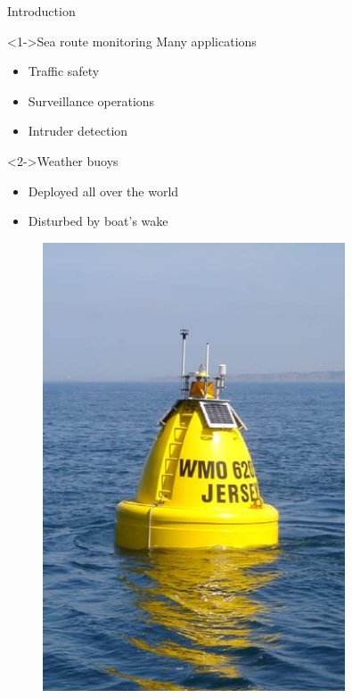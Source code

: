 \documentclass{beamer}
\begin{document}
            \begin{frame}{Introduction}
                \begin{minipage}[b]{0.55\textwidth}
                    \begin{block}<1->{Sea route monitoring}
                        Many applications
                        \begin{itemize}
                            \item Traffic safety
                            \item Surveillance operations
                            \item Intruder detection
                        \end{itemize}
                    \end{block}
                    \begin{block}<2->{Weather buoys}
                        \begin{itemize}
                            \item Deployed all over the world\footnotemark[1]
                            \item Disturbed by boat's wake
                        \end{itemize}
                    \end{block}
                \end{minipage}
                \hfill
                \begin{minipage}[b]{0.4\textwidth}
                    \begin{figure}
                        \includegraphics[width=0.8\textwidth, trim={0, 50, 0, 50}, clip]{imgs/buoy}

\end{figure}
\end{minipage}
\end{frame}
\end{document}
